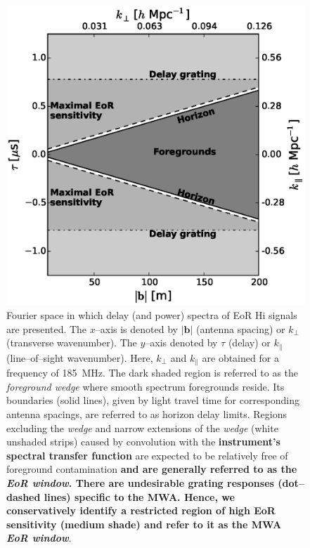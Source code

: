 \documentclass[preprint2,iop,numberedappendix]{emulateapj}
\begin{document}
\begin{figure}[htb]
\centering
\includegraphics[width=\linewidth]{figure2.eps}
\caption{Fourier space in which delay (and power) spectra of EoR H{\sc i} signals are presented. The $x$--axis is denoted by $|\boldsymbol{b}|$ (antenna spacing) or $k_\perp$ (transverse wavenumber). The $y$--axis denoted by $\tau$ (delay) or $k_\parallel$ (line--of--sight wavenumber). Here, $k_\perp$ and $k_\parallel$ are obtained for a frequency of 185~MHz. The dark shaded region is referred to as the {\it foreground wedge} where smooth spectrum foregrounds reside. Its boundaries (solid lines), given by light travel time for corresponding antenna spacings, are referred to as horizon delay limits. Regions excluding the {\it wedge} and narrow extensions of the {\it wedge} (white unshaded strips) caused by convolution with the {\bf instrument's spectral transfer function} are expected to be relatively free of foreground contamination {\bf and are generally referred to as the {\it EoR window}. There are undesirable grating responses (dot--dashed lines) specific to the MWA. Hence, we conservatively identify a restricted region of high EoR sensitivity (medium shade) and refer to it as the MWA {\it EoR window}}. \label{fig:fourier-space}}
\end{figure}
\end{document}
